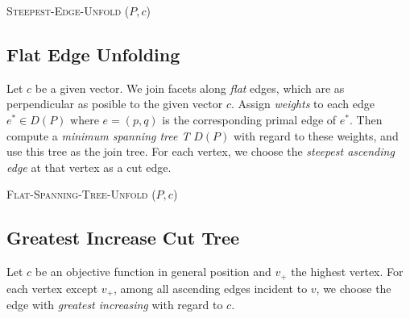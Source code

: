 \documentclass[11pt, letterpaper]{article}
\begin{document}
\begin{algorithm}
\caption{\textsc{Steepest-Edge-Unfold} ($P, c$)}\label{algo:steepest}
\begin{algorithmic}

        
    \EndFor
\end{algorithmic}
\end{algorithm}

\subsection{Flat Edge Unfolding}
Let $c$ be a given vector. We join facets along \textit{flat} edges, which are as perpendicular as posible to the given vector $c$. Assign \textit{weights} to each edge $e^* \in D(P)$ where $e = (p,q)$  is the corresponding primal edge of $e^*$. Then compute a \textit{minimum spanning tree T} $D(P)$ with regard to these weights, and use this tree as the join tree.
For each vertex, we choose the \textit{steepest ascending edge} at that vertex as a cut edge.

\begin{algorithm}
\caption{\textsc{Flat-Spanning-Tree-Unfold} ($P, c$)}\label{algo:flat}
\begin{algorithmic}

    \EndFor
\end{algorithmic}
\end{algorithm}



\subsection{Greatest Increase Cut Tree}
Let $c$ be an objective function in general position and $v_+$ the highest vertex. For each vertex except $v_+$, among all ascending edges incident to $v$, we choose the edge with \textit{greatest increasing} with regard to $c$. 
\end{document}
